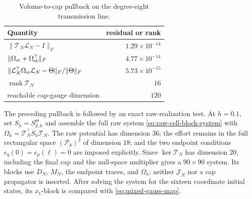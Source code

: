 \documentclass[11pt,a4paper]{article}
\begin{document}
\begin{table}[H]
\centering
\caption{Volume-to-cap pullback on the degree-eight transmission line.}
\label{tab:line-pullback}
\begin{tabular}{@{}lr@{}}
\toprule
Quantity & residual or rank \\ \midrule
\(\|\mathcal T_N\mathcal L_N-I\|_F\)
& \(1.29\times10^{-14}\)\\
\(\|\Omega_{\rm st}+\Omega_{\rm st}^\top\|_F\)
& \(4.77\times10^{-14}\)\\
\(\|\mathcal L_N^\top\Omega_{\rm st}\mathcal L_N-\Theta\|_F/
  \|\Theta\|_F\)
& \(5.73\times10^{-15}\)\\
\(\operatorname{rank}\mathcal T_N\) & \(16\)\\
reachable cap-gauge dimension & \(120\)\\
\bottomrule
\end{tabular}
\end{table}

The preceding pullback is followed by an exact raw-realization test.  At
\(h=0.1\), set \(S_h=S_{2,h}^{\Theta}\) and assemble the full raw system
\cref{eq:raw-cell-block-system} with
\(\Omega_h=\mathcal T_N^\top S_h\mathcal T_N\).  The raw potential has
dimension \(36\); the effort remains in the full rectangular space
\((\mathcal P_8)^2\) of dimension \(18\); and the two endpoint conditions
\(e_q(0)=e_p(\ell)=0\) are imposed explicitly.  Since
\(\ker\mathcal T_N\) has dimension \(20\), including the final cap and
the null-space multiplier gives a \(90\times90\) system.  Its blocks use
\(D_N\), \(M_N\), the endpoint traces, and \(\Omega_h\); neither
\(\mathcal J_N\) nor a cap propagator is inserted.  After solving the
system for the sixteen coordinate initial states, its \(x_1\)-block is
compared with \cref{eq:mixed-gauss-map}.
\end{document}
